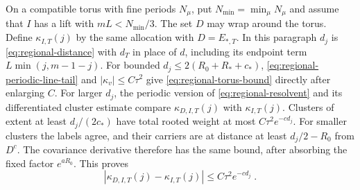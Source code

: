 \documentclass[11pt]{article}
\begin{document}
On a compatible torus with fine periods $N_\mu$, put $N_{\min}=\min_\mu N_\mu$ and assume that $I$ has a lift with $mL<N_{\min}/3$. The set $D$ may wrap around the torus. Define $\kappa_{I,T}(j)$ by the same allocation with $D=E_{*,T}$. In this paragraph $d_j$ is \eqref{eq:regional-distance} with $d_T$ in place of $d$, including its endpoint term $L\min(j,m-1-j)$. For bounded $d_j\leq 2(R_0+R_*+c_*)$, \eqref{eq:regional-periodic-line-tail} and $|\kappa_v|\leq C\tau^2$ give \eqref{eq:regional-torus-bound} directly after enlarging $C$. For larger $d_j$, the periodic version of \eqref{eq:regional-resolvent} and its differentiated cluster estimate compare $\kappa_{D,I,T}(j)$ with $\kappa_{I,T}(j)$. Clusters of extent at least $d_j/(2c_*)$ have total rooted weight at most $C\tau^2e^{-cd_j}$. For smaller clusters the labels agree, and their carriers are at distance at least $d_j/2-R_0$ from $D^c$. The covariance derivative therefore has the same bound, after absorbing the fixed factor $e^{aR_0}$. This proves
\begin{equation}
    |\kappa_{D,I,T}(j)-\kappa_{I,T}(j)|
        \leq C\tau^2e^{-cd_j}\;.
\end{equation}
\end{document}
